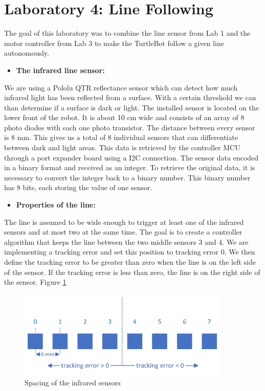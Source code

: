 \documentclass[english]{article}
\begin{document}
\section{Laboratory 4: Line Following}
The goal of this laboratory was to combine the line sensor from
Lab 1 and the motor controller from Lab 3 to make the TurtleBot 
follow a given line autonomously.  
\begin{itemize}
    \item \textbf{The infrared line sensor:} 
\end{itemize}
We are using a Pololu QTR reflectance sensor which can detect how much infrared 
light has been reflected from a surface. With a certain threshold we can than determine 
if a surface is dark or light. The installed sensor is located on the lower front of the
 robot. It is about 10 cm wide and consists of an array of 8 photo diodes with each one 
 photo transistor. The distance between every sensor is 8 mm. This gives us a total of 8
  individual sensors that can differentiate between dark and light areas. This data is 
 retrieved by the controller MCU through a port expander board using a I2C connection.
  The sensor data encoded in a binary format and received as an integer. To retrieve
  the original data, it is necessary to convert the integer back to a binary number.
 This binary number has 8 bits, each storing the value of one sensor.  
 \begin{itemize}
    \item \textbf{Properties of the line:} 
\end{itemize}
The line is assumed to be wide enough to trigger at least one of the infrared sensors 
and at most two at the same time. The goal is to create a controller algorithm that 
keeps the line between the two middle sensors 3 and 4. We are implementing a tracking 
error and set this position to tracking error 0. We then define the tracking error to 
be greater than zero when the line is on the left side of the sensor. If the tracking 
error is less than zero, the line is on the right side of the sensor. Figure \ref{fig:line}
\begin{figure}[!h]
    \centering
    \includegraphics[width=0.90\textwidth, height=0.25\textheight]{figures/line.png}
    \caption{Spacing of the infrared sensors}
    \label{fig:line}
\end{figure}
\end{document}
